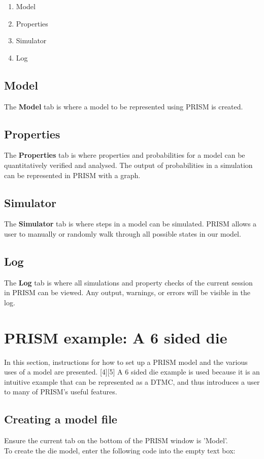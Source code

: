 \documentclass[a4paper]{article}
\begin{document}
\begin{enumerate}
\item Model
\item Properties
\item Simulator
\item Log
\end{enumerate}


\subsection{Model} The \textbf{Model} tab is where a model to be represented using PRISM is created.


\subsection{Properties} The \textbf{Properties} tab is where properties and probabilities for a model can be quantitatively verified and analysed. The output of probabilities in a simulation can be represented in PRISM with a graph.

\subsection{Simulator}
The \textbf{Simulator} tab is where steps in a model can be simulated. PRISM allows a user to manually or randomly walk through all possible states in our model.

\subsection{Log}
The \textbf{Log} tab is where all simulations and property checks of the current session in PRISM can be viewed. Any output, warnings, or errors will be visible in the log. 

\newpage






\section{PRISM example: A 6 sided die }
In this section, instructions for how to set up a PRISM model and the various uses of a model are presented. [4][5] A 6 sided die example is used because it is an intuitive example that can be represented as a DTMC, and thus introduces a user to many of PRISM's useful features.

\subsection{Creating a model file}
Ensure the current tab on the bottom of the PRISM window is 'Model'. 
\\[1\baselineskip]
To create the die model, enter the following code into the empty text box:
\end{document}
